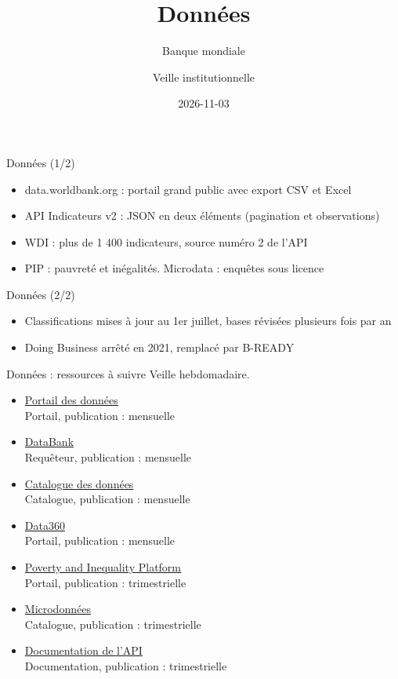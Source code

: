 \documentclass[aspectratio=169,11pt]{beamer}
\title{Données}
\subtitle{Banque mondiale}
\author{Veille institutionnelle}
\date{2026-11-03}
\begin{document}
\begin{frame}\titlepage\end{frame}

\begin{frame}{Données (1/2)}
\begin{itemize}
\item data.worldbank.org : portail grand public avec export CSV et Excel
\item API Indicateurs v2 : JSON en deux éléments (pagination et observations)
\item WDI : plus de 1 400 indicateurs, source numéro 2 de l'API
\item PIP : pauvreté et inégalités. Microdata : enquêtes sous licence
\end{itemize}
\end{frame}

\begin{frame}{Données (2/2)}
\begin{itemize}
\item Classifications mises à jour au 1er juillet, bases révisées plusieurs fois par an
\item Doing Business arrêté en 2021, remplacé par B-READY
\end{itemize}
\end{frame}

\begin{frame}{Données : ressources à suivre}
\small
Veille hebdomadaire.
\begin{itemize}
\item \href{https://data.worldbank.org}{Portail des données}\\{\footnotesize Portail, publication : mensuelle}
\item \href{https://databank.worldbank.org}{DataBank}\\{\footnotesize Requêteur, publication : mensuelle}
\item \href{https://datacatalog.worldbank.org}{Catalogue des données}\\{\footnotesize Catalogue, publication : mensuelle}
\item \href{https://data360.worldbank.org}{Data360}\\{\footnotesize Portail, publication : mensuelle}
\item \href{https://pip.worldbank.org}{Poverty and Inequality Platform}\\{\footnotesize Portail, publication : trimestrielle}
\item \href{https://microdata.worldbank.org}{Microdonnées}\\{\footnotesize Catalogue, publication : trimestrielle}
\item \href{https://datahelpdesk.worldbank.org/knowledgebase/articles/889386-developer-information}{Documentation de l'API}\\{\footnotesize Documentation, publication : trimestrielle}
\end{itemize}
\end{frame}
\end{document}
